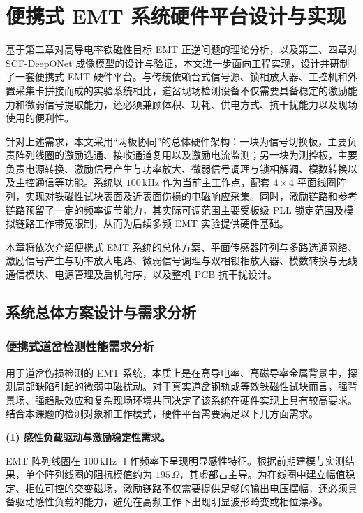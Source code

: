 \chapter{便携式 EMT 系统硬件平台设计与实现}

基于第二章对高导电率铁磁性目标 EMT 正逆问题的理论分析，以及第三、四章对 SCF-DeepONet 成像模型的设计与验证，本文进一步面向工程实现，设计并研制了一套便携式 EMT 硬件平台。与传统依赖台式信号源、锁相放大器、工控机和外置采集卡拼接而成的实验系统相比，道岔现场检测设备不仅需要具备稳定的激励能力和微弱信号提取能力，还必须兼顾体积、功耗、供电方式、抗干扰能力以及现场使用的便利性。

针对上述需求，本文采用``两板协同''的总体硬件架构：一块为信号切换板，主要负责阵列线圈的激励选通、接收通道复用以及激励电流监测；另一块为测控板，主要负责电源转换、激励信号产生与功率放大、微弱信号调理与锁相解调、模数转换以及主控通信等功能。系统以 $100\,\mathrm{kHz}$ 作为当前主工作点，配套 $4\times4$ 平面线圈阵列，实现对铁磁性试块表面及近表面伤损的电磁响应采集。同时，激励链路和参考链路预留了一定的频率调节能力，其实际可调范围主要受板级 PLL 锁定范围及模拟链路工作带宽限制，从而为后续多频 EMT 实验提供硬件基础。

本章将依次介绍便携式 EMT 系统的总体方案、平面传感器阵列与多路选通网络、激励信号产生与功率放大电路、微弱信号调理与双相锁相放大器、模数转换与无线通信模块、电源管理及启机时序，以及整机 PCB 抗干扰设计。

\section{系统总体方案设计与需求分析}

\subsection{便携式道岔检测性能需求分析}

用于道岔伤损检测的 EMT 系统，本质上是在高导电率、高磁导率金属背景中，探测局部缺陷引起的微弱电磁扰动。对于真实道岔钢轨或等效铁磁性试块而言，强背景场、强趋肤效应和复杂现场环境共同决定了该系统在硬件实现上具有较高要求。结合本课题的检测对象和工作模式，硬件平台需要满足以下几方面需求。

\textbf{(1) 感性负载驱动与激励稳定性需求。}

EMT 阵列线圈在 $100\,\mathrm{kHz}$ 工作频率下呈现明显感性特征。根据前期建模与实测结果，单个阵列线圈的阻抗模值约为 $195\,\Omega$，其虚部占主导。为在线圈中建立幅值稳定、相位可控的交变磁场，激励链路不仅需要提供足够的输出电压摆幅，还必须具备驱动感性负载的能力，避免在高频工作下出现明显波形畸变或相位漂移。

